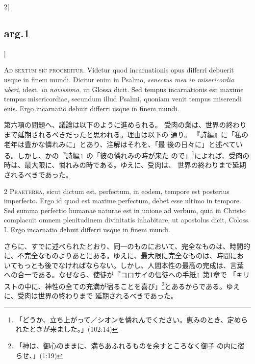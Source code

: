 \documentclass[paper=a4paper,fontsize=10pt,jafontsize=9pt,titlepage]{jlreq}
\begin{document}
\begin{paracol}{2}[\subsection{arg.1}]

{\Huge A}{\scshape d sextum sic proceditur}. Videtur quod
incarnationis opus differri debuerit usque in finem mundi. Dicitur enim
in Psalmo, {\itshape senectus mea in misericordia uberi}, idest, {\itshape in novissimo}, ut
Glossa dicit. Sed tempus incarnationis est maxime tempus misericordiae,
secundum illud Psalmi, quoniam venit tempus miserendi eius. Ergo
incarnatio debuit differri usque in finem mundi.

\switchcolumn

第六項の問題へ、議論は以下のように進められる。
受肉の業は、世界の終わりまで延期されるべきだったと思われる。理由は以下の
 通り。
『詩編』に「私の老年は豊かな憐れみに」とあり、注解はそれを、「最
 後の日々に」と述べている。しかし、かの『詩編』の「彼の憐れみの時が来た
 ので」\footnote{「どうか、立ち上がって／シオンを憐れんでください。恵みのとき、定められたときが来ました。」(102:14)}によれば、受肉の時は、最大限に、憐れみの時である。ゆえに、受肉は、
 世界の終わりまで延期されるべきであった。


{\scshape 2 Praeterea}, sicut dictum est, perfectum, in
eodem, tempore est posterius imperfecto. Ergo id quod est maxime
perfectum, debet esse ultimo in tempore. Sed summa perfectio humanae
naturae est in unione ad verbum, quia in Christo complacuit omnem
plenitudinem divinitatis inhabitare, ut apostolus dicit, Coloss. I. Ergo
incarnatio debuit differri usque in finem mundi.

\switchcolumn

さらに、すでに述べられたとおり、同一のものにおいて、完全なものは、時間的
 に、不完全なものよりあとにある。ゆえに、最大限に完全なものは、時間にお
 いてもっとも後でなければならない。しかし、人間本性の最高の完成は、言葉
 への合一である。なぜなら、使徒が『コロサイの信徒への手紙』第1章で
 「キリストの中に、神性の全ての充満が宿ることを喜び」\footnote{「神は、御心のままに、満ちあふれるものを余すところなく御子
 の内に宿らせ、」(1:19)}とあるからである。ゆえに、受肉は世界の終わりまで
 延期されるべきであった。



\end{paracol}
\end{document}
